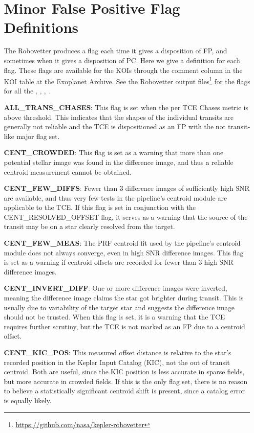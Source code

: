 \section{Minor False Positive Flag Definitions}
\label{s:minorflags}
The Robovetter produces a flag each time it gives a disposition of FP, and sometimes when it gives a disposition of PC.  Here we give a definition for each flag.  These flags are available for the KOIs through the comment column in the KOI table at the Exoplanet Archive. See the Robovetter output files\footnote{\url{https://github.com/nasa/kepler-robovetter}} for the flags for all the , , , .


\textbf{ALL\_TRANS\_CHASES}: This flag is set when the per TCE Chases metric is above threshold. This indicates that the shapes of the individual transits are generally not reliable and the TCE is dispositioned as an FP with the not transit-like major flag set.

\textbf{CENT\_CROWDED}: This flag is set as a warning that more than one potential stellar image was found in the difference image, and thus a reliable centroid measurement cannot be obtained.

\textbf{CENT\_FEW\_DIFFS}: Fewer than 3 difference images of sufficiently high SNR are available, and thus very few tests in the pipeline's centroid module are applicable to the TCE. If this flag is set in conjunction with the CENT\_RESOLVED\_OFFSET flag, it serves as a warning that the source of the transit may be on a star clearly resolved from the target.

\textbf{CENT\_FEW\_MEAS}: The PRF centroid fit used by the pipeline's centroid module does not always converge, even in high SNR difference images. This flag is set as a warning if centroid offsets are recorded for fewer than 3 high SNR difference images.

\textbf{CENT\_INVERT\_DIFF}: One or more difference images were inverted, meaning the difference image claims the star got brighter during transit. This is usually due to variability of the target star and suggests the difference image should not be trusted. When this flag is set, it is a warning that the TCE requires further scrutiny, but the TCE is not marked as an FP due to a centroid offset.

\textbf{CENT\_KIC\_POS}: This measured offset distance is relative to the star's recorded position in the Kepler Input Catalog (KIC), not the out of transit centroid. Both are useful, since the KIC position is less accurate in sparse fields, but more accurate in crowded fields. If this is the only flag set, there is no reason to believe a statistically significant centroid shift is present, since a catalog error is equally likely.

